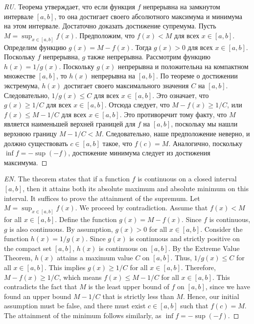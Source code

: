 \begin{proof}[RU]
Теорема утверждает, что если функция $f$ непрерывна на замкнутом интервале $[a, b]$, то она достигает своего абсолютного максимума и минимума на этом интервале. Достаточно доказать достижение супремума.
Пусть $M = \sup_{x \in [a, b]} f(x)$. Предположим, что $f(x) < M$ для всех $x \in [a, b]$.
Определим функцию $g(x) = M - f(x)$. Тогда $g(x) > 0$ для всех $x \in [a, b]$.
Поскольку $f$ непрерывна, $g$ также непрерывна.
Рассмотрим функцию $h(x) = 1/g(x)$. Поскольку $g(x)$ непрерывна и положительна на компактном множестве $[a, b]$, то $h(x)$ непрерывна на $[a, b]$.
По теореме о достижении экстремума, $h(x)$ достигает своего максимального значения $C$ на $[a, b]$.
Следовательно, $1/g(x) \leq C$ для всех $x \in [a, b]$.
Это означает, что $g(x) \geq 1/C$ для всех $x \in [a, b]$.
Отсюда следует, что $M - f(x) \geq 1/C$, или $f(x) \leq M - 1/C$ для всех $x \in [a, b]$.
Это противоречит тому факту, что $M$ является наименьшей верхней границей для $f$ на $[a, b]$, поскольку мы нашли верхнюю границу $M - 1/C < M$.
Следовательно, наше предположение неверно, и должно существовать $c \in [a, b]$ такое, что $f(c) = M$.
Аналогично, поскольку $\inf f = -\sup (-f)$, достижение минимума следует из достижения максимума.
\end{proof}
\begin{proof}[EN]
The theorem states that if a function $f$ is continuous on a closed interval $[a, b]$, then it attains both its absolute maximum and absolute minimum on this interval. It suffices to prove the attainment of the supremum.
Let $M = \sup_{x \in [a, b]} f(x)$. We proceed by contradiction. Assume that $f(x) < M$ for all $x \in [a, b]$.
Define the function $g(x) = M - f(x)$. Since $f$ is continuous, $g$ is also continuous. By assumption, $g(x) > 0$ for all $x \in [a, b]$.
Consider the function $h(x) = 1/g(x)$. Since $g(x)$ is continuous and strictly positive on the compact set $[a, b]$, $h(x)$ is continuous on $[a, b]$.
By the Extreme Value Theorem, $h(x)$ attains a maximum value $C$ on $[a, b]$.
Thus, $1/g(x) \leq C$ for all $x \in [a, b]$.
This implies $g(x) \geq 1/C$ for all $x \in [a, b]$.
Therefore, $M - f(x) \geq 1/C$, which means $f(x) \leq M - 1/C$ for all $x \in [a, b]$.
This contradicts the fact that $M$ is the least upper bound of $f$ on $[a, b]$, since we have found an upper bound $M - 1/C$ that is strictly less than $M$.
Hence, our initial assumption must be false, and there must exist $c \in [a, b]$ such that $f(c) = M$.
The attainment of the minimum follows similarly, as $\inf f = -\sup (-f)$.
\end{proof}
